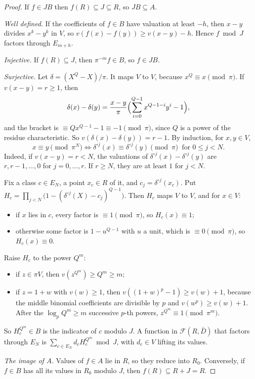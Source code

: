 \documentclass[11pt,a4paper]{article}
\theoremstyle{plain}
\theoremstyle{remark}
\newcommand{\Fn}{\mathcal F}
\begin{document}
\begin{proof}
If $f\in JB$ then $f(R)\subseteq J\subseteq R$, so $JB\subseteq A$.

\emph{Well defined.} If the coefficients of $f\in B$ have valuation at least $-h$, then $x-y$ divides $x^k-y^k$ in
$V$, so $v(f(x)-f(y))\geq v(x-y)-h$. Hence $f\bmod J$ factors through $E_{m+h}$.

\emph{Injective.} If $f(R)\subseteq J$, then $\pi^{-m}f\in B$, so $f\in JB$.

\emph{Surjective.} Let $\delta=(X^Q-X)/\pi$. It maps $V$ to $V$, because $x^Q\equiv x\pmod\pi$. If $v(x-y)=r\geq1$,
then
\[
 \delta(x)-\delta(y)=\frac{x-y}{\pi}\Bigl(\sum_{i=0}^{Q-1}x^{Q-1-i}y^i-1\Bigr),
\]
and the bracket is $\equiv Qx^{Q-1}-1\equiv-1\pmod\pi$, since $Q$ is a power of the residue characteristic. So
$v(\delta(x)-\delta(y))=r-1$. By induction, for $x,y\in V$,
\[
 x\equiv y\pmod{\pi^N}\iff \delta^{\circ j}(x)\equiv\delta^{\circ j}(y)\pmod\pi\ \text{ for } 0\leq j<N .
\]
Indeed, if $v(x-y)=r<N$, the valuations of $\delta^{\circ j}(x)-\delta^{\circ j}(y)$ are $r,r-1,\dots,0$ for
$j=0,\dots,r$. If $r\geq N$, they are at least $1$ for $j<N$.

Fix a class $c\in E_N$, a point $x_c\in R$ of it, and $c_j=\delta^{\circ j}(x_c)$. Put
$H_c=\prod_{j<N}\bigl(1-(\delta^{\circ j}(X)-c_j)^{Q-1}\bigr)$. Then $H_c$ maps $V$ to $V$, and for $x\in V$:
\begin{itemize}
\item if $x$ lies in $c$, every factor is $\equiv1\pmod\pi$, so $H_c(x)\equiv1$;
\item otherwise some factor is $1-u^{Q-1}$ with $u$ a unit, which is $\equiv0\pmod\pi$, so $H_c(x)\equiv0$.
\end{itemize}
Raise $H_c$ to the power $Q^m$:
\begin{itemize}
\item if $z\in\pi V$, then $v(z^{Q^m})\geq Q^m\geq m$;
\item if $z=1+w$ with $v(w)\geq1$, then $v((1+w)^p-1)\geq v(w)+1$, because the middle binomial coefficients are
divisible by $p$ and $v(w^p)\geq v(w)+1$. After the $\log_pQ^m\geq m$ successive $p$-th powers,
$z^{Q^m}\equiv1\pmod{\pi^m}$.
\end{itemize}
So $H_c^{Q^m}\in B$ is the indicator of $c$ modulo $J$. A function in $\Fn(R,\bar D)$ that factors through
$E_N$ is $\sum_{c\in E_N}d_cH_c^{Q^m}\bmod J$, with $d_c\in V$ lifting its values.

\emph{The image of $A$.} Values of $f\in A$ lie in $R$, so they reduce into $R_0$. Conversely, if $f\in B$ has all
its values in $R_0$ modulo $J$, then $f(R)\subseteq R+J=R$.
\end{proof}
\end{document}
